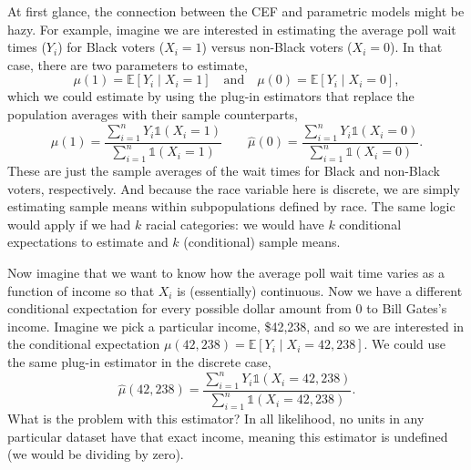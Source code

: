 \documentclass[
  letterpaper,
  DIV=11,
  numbers=noendperiod]{scrreprt}
\newcommand{\E}{\mathbb{E}}
\theoremstyle{definition}
\theoremstyle{definition}
\theoremstyle{plain}
\theoremstyle{remark}
\begin{document}
At first glance, the connection between the CEF and parametric models
might be hazy. For example, imagine we are interested in estimating the
average poll wait times (\(Y_i\)) for Black voters (\(X_i = 1\)) versus
non-Black voters (\(X_i=0\)). In that case, there are two parameters to
estimate, \[
\mu(1) = \E[Y_i \mid X_i = 1] \quad \text{and}\quad \mu(0) = \E[Y_i \mid X_i = 0],
\] which we could estimate by using the plug-in estimators that replace
the population averages with their sample counterparts, \[ 
\widehat{\mu}(1) = \frac{\sum_{i=1}^{n} Y_{i}\mathbb{1}(X_{i} = 1)}{\sum_{i=1}^{n}\mathbb{1}(X_{i} = 1)} \qquad \widehat{\mu}(0) = \frac{\sum_{i=1}^{n} Y_{i}\mathbb{1}(X_{i} = 0)}{\sum_{i=1}^{n}\mathbb{1}(X_{i} = 0)}.
\] These are just the sample averages of the wait times for Black and
non-Black voters, respectively. And because the race variable here is
discrete, we are simply estimating sample means within subpopulations
defined by race. The same logic would apply if we had \(k\) racial
categories: we would have \(k\) conditional expectations to estimate and
\(k\) (conditional) sample means.

Now imagine that we want to know how the average poll wait time varies
as a function of income so that \(X_i\) is (essentially) continuous. Now
we have a different conditional expectation for every possible dollar
amount from 0 to Bill Gates's income. Imagine we pick a particular
income, \$42,238, and so we are interested in the conditional
expectation \(\mu(42,238)= \E[Y_{i}\mid X_{i} = 42,238]\). We could use
the same plug-in estimator in the discrete case, \[
\widehat{\mu}(42,238) = \frac{\sum_{i=1}^{n} Y_{i}\mathbb{1}(X_{i} = 42,238)}{\sum_{i=1}^{n}\mathbb{1}(X_{i} = 42,238)}.
\] What is the problem with this estimator? In all likelihood, no units
in any particular dataset have that exact income, meaning this estimator
is undefined (we would be dividing by zero).
\end{document}
